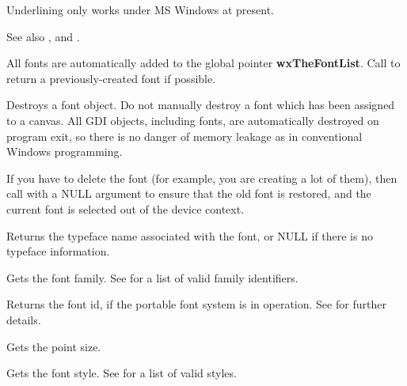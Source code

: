 Underlining only works under MS Windows at present.

See also , 
and .

All fonts are automatically added to the global pointer {\bf wxTheFontList}.
Call  to return
a previously-created font if possible.



Destroys a font object. Do not manually destroy a font which has been
assigned to a canvas. All GDI objects, including fonts, are
automatically destroyed on program exit, so there is no danger of memory
leakage as in conventional Windows programming.

If you have to delete the font (for example, you are creating a lot of
them), then call  with a NULL argument
to ensure that the old font is restored, and the current font is selected
out of the device context.



Returns the typeface name associated with the font, or NULL if there is no
typeface information.



Gets the font family. See  for a list of valid
family identifiers.



Returns the font id, if the portable font system is in operation. See  for
further details.



Gets the point size.



Gets the font style.  See  for a list of valid
styles.


